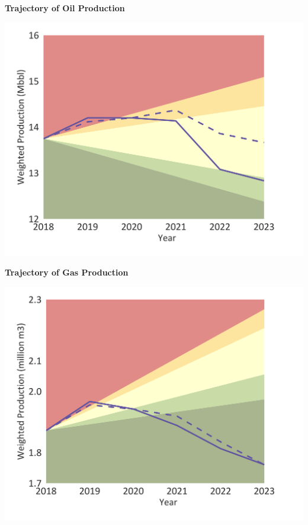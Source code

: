 \documentclass[10pt,table,a4]{article}\usepackage[]{graphicx}\usepackage[]{color}
\begin{document}
	\begin{minipage}[t]{.49\linewidth}
		\textbf{Trajectory of Oil Production }
		
		\includegraphics[trim = {0 0cm 0 0},width=1\linewidth]{CAFigures/Fig11}
		
	\end{minipage}	
	\hspace{.02\linewidth}
	\begin{minipage}[t]{.49\textwidth}
		\textbf{Trajectory of Gas Production }
		
		\includegraphics[trim = {0 0cm 0 0},width=1\linewidth]{CAFigures/Fig12}
		
	\end{minipage}
	
\end{document}
